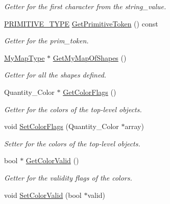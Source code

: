 \begin{DoxyCompactItemize}
\begin{DoxyCompactList}\small\item\em Getter for the first character from the string\_\-value. \item\end{DoxyCompactList}\item 
\hyperlink{csg2_dparser_8hpp_ab40fb89cc758bdfbf49d368eb0110f47}{PRIMITIVE\_\-TYPE} \hyperlink{class_c_s_g_scanner_a08d690f71658d2262ae5bc8587153c1e}{GetPrimitiveToken} () const 
\begin{DoxyCompactList}\small\item\em Getter for the prim\_\-token. \item\end{DoxyCompactList}\item 
\hyperlink{csg2_dparser_8hpp_a251f6b5350190316faa1b5a8034cee33}{MyMapType} $\ast$ \hyperlink{class_c_s_g_scanner_abfd09d47edaa7c2eb708acfbe5e0b4da}{GetMyMapOfShapes} ()
\begin{DoxyCompactList}\small\item\em Getter for all the shapes defined. \item\end{DoxyCompactList}\item 
Quantity\_\-Color $\ast$ \hyperlink{class_c_s_g_scanner_a18a40df7abd244eba784765683881a0f}{GetColorFlags} ()
\begin{DoxyCompactList}\small\item\em Getter for the colors of the top-\/level objects. \item\end{DoxyCompactList}\item 
void \hyperlink{class_c_s_g_scanner_a9ccdf1031d602b442f0085e2139e58e7}{SetColorFlags} (Quantity\_\-Color $\ast$array)
\begin{DoxyCompactList}\small\item\em Setter for the colors of the top-\/level objects. \item\end{DoxyCompactList}\item 
bool $\ast$ \hyperlink{class_c_s_g_scanner_a0e4809b5ce11a52e470d2b436badaae6}{GetColorValid} ()
\begin{DoxyCompactList}\small\item\em Getter for the validity flags of the colors. \item\end{DoxyCompactList}\item 
void \hyperlink{class_c_s_g_scanner_a023fe9a7c16ef1edbd16598a52a7a0ce}{SetColorValid} (bool $\ast$valid)

\end{DoxyCompactItemize}
